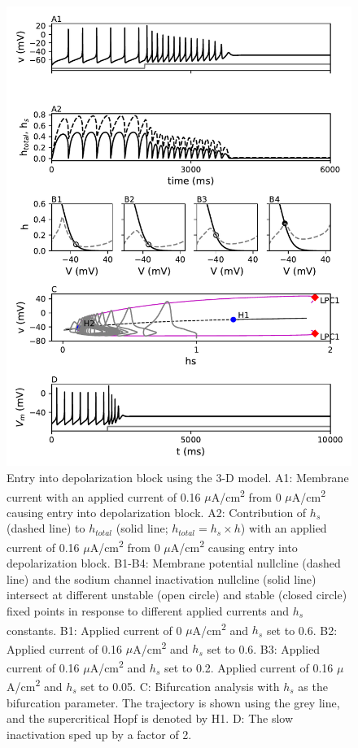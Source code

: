 \begin{figure}
	\centering
	\includegraphics[scale=0.7]{../figures/figure_3.pdf}
	\caption{Entry into depolarization block using the 3-D model. A1: Membrane current with an applied current of 0.16 $\mu$A/cm\textsuperscript{2} from 0 $\mu$A/cm\textsuperscript{2} causing entry into depolarization block. A2: Contribution of $h_s$ (dashed line) to $h_{total}$ (solid line; $h_{total}= h_{s} \times h$) with an applied current of 0.16 $\mu$A/cm\textsuperscript{2} from 0 $\mu$A/cm\textsuperscript{2} causing entry into depolarization block. B1-B4: Membrane potential nullcline (dashed line) and the sodium channel inactivation nullcline (solid line) intersect at different unstable (open circle) and stable (closed circle) fixed points in response to different applied currents and $h_s$ constants. B1: Applied current of 0 $\mu$A/cm\textsuperscript{2} and $h_s$ set to 0.6. B2: Applied current of 0.16 $\mu$A/cm\textsuperscript{2} and $h_s$ set to 0.6. B3: Applied current of 0.16 $\mu$A/cm\textsuperscript{2} and $h_s$ set to 0.2. Applied current of 0.16 $\mu$A/cm\textsuperscript{2} and $h_s$ set to 0.05. C: Bifurcation analysis with $h_s$ as the bifurcation parameter. The trajectory is shown using the grey line, and the supercritical Hopf is denoted by H1. D: The slow inactivation sped up by a factor of 2.}
	\label{fig:3}
\end{figure}

